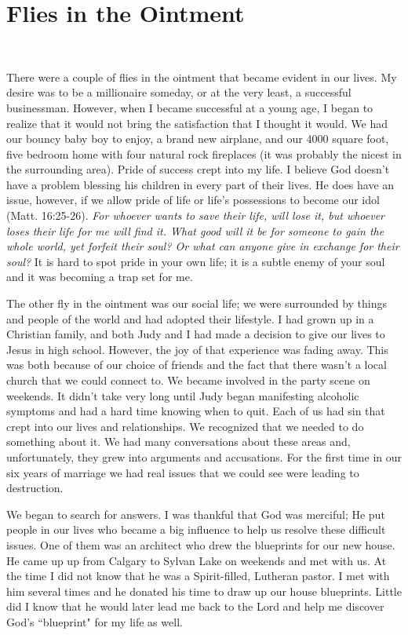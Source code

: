 \documentclass[oneside]{book}
\begin{document}
\section{Flies in the Ointment}
\

There were a couple of flies in the ointment that became evident in our lives. My desire was to be a millionaire someday, or at the very least, a successful businessman. However, when I became successful at a young age, I began to realize that it would not bring the satisfaction that I thought it would. We had our bouncy baby boy to enjoy, a brand new airplane, and our 4000 square foot, five bedroom home with four natural rock fireplaces (it was probably the nicest in the surrounding area).  Pride of success crept into my life. I believe God doesn't have a problem blessing his children in every part of their lives. He does have an issue, however, if we allow pride of life or life's possessions to become our idol (Matt. 16:25-26). \textit{For whoever wants to save their life, will lose it, but whoever loses their life for me will find it. What good will it be for someone to gain the whole world, yet forfeit their soul? Or what can anyone give in exchange for their soul?} It is hard to spot pride in your own life; it is a subtle enemy of your soul and it was becoming a trap set for me.

The other fly in the ointment was our social life; we were surrounded by things and people of the world and had adopted their lifestyle. I had grown up in a Christian family, and both Judy and I had made a decision to give our lives to Jesus in high school. However, the joy of that experience was fading away. This was both because of our choice of friends and the fact that there wasn't a local church that we could connect to. We became involved in the party scene on weekends. It didn't take very long until Judy began manifesting alcoholic symptoms and had a hard time knowing when to quit. Each of us had sin that crept into our lives and relationships. We recognized that we needed to do something about it. We had many conversations about these areas and, unfortunately, they grew into arguments and accusations. For the first time in our six years of marriage we had real issues that we could see were leading to destruction.

We began to search for answers. I was thankful that God was merciful; He put people in our lives who became a big influence to help us resolve these difficult issues. One of them was an architect who drew the blueprints for our new house. He came up up from Calgary to Sylvan Lake on weekends and met with us. At the time I did not know that he was a Spirit-filled, Lutheran pastor. I met with him several times and he donated his time to draw up our house blueprints. Little did I know that he would later lead me back to the Lord and help me discover God's ``blueprint" for my life as well.
\end{document}
